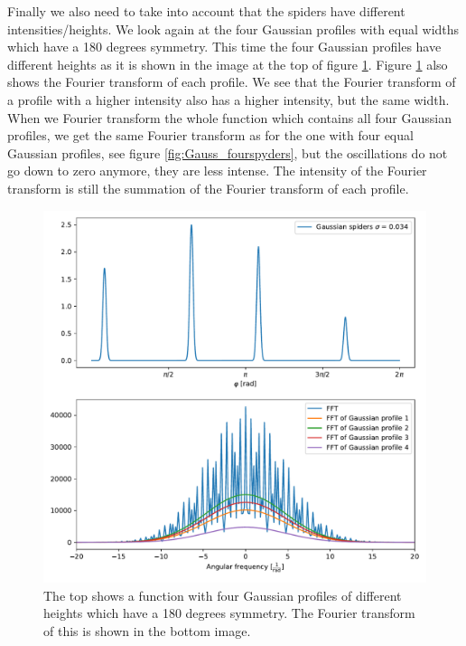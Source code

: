 Finally we also need to take into account that the spiders have different intensities/heights. We look again at the four Gaussian profiles with equal widths which have a 180 degrees symmetry. This time the four Gaussian profiles have different heights as it is shown in the image at the top of figure \ref{fig:Gaussian_fourheightspyders}. Figure \ref{fig:Gaussian_fourheightspyders} also shows the Fourier transform of each profile. We see that the Fourier transform of a profile with a higher intensity also has a higher intensity, but the same width. When we Fourier transform the whole function which contains all four Gaussian profiles, we get the same Fourier transform as for the one with four equal Gaussian profiles, see figure \ref{fig:Gauss_fourspyders}, but the oscillations do not go down to zero anymore, they are less intense. The intensity of the Fourier transform is still the summation of the Fourier transform of each profile. 
\begin{figure}[H]
	\centering
		\includegraphics[width=1.0\textwidth]{pics/Gaussian_fourheightspyders.pdf}
		\caption{The top shows a function with four Gaussian profiles of different heights which have a 180 degrees symmetry. The Fourier transform of this is shown in the bottom image.}
		\label{fig:Gaussian_fourheightspyders}
\end{figure}

